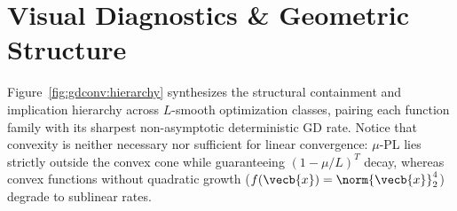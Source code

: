 \documentclass[../../../../master.tex]{subfiles}
\begin{document}
\section{Visual Diagnostics \& Geometric Structure}
\label{sec:gdconv:visuals}

Figure~\ref{fig:gdconv:hierarchy} synthesizes the structural containment and implication hierarchy across $L$-smooth optimization classes, pairing each function family with its sharpest non-asymptotic deterministic GD rate. Notice that convexity is neither necessary nor sufficient for linear convergence: $\mu$-PL lies strictly outside the convex cone while guaranteeing $(1-\mu/L)^T$ decay, whereas convex functions without quadratic growth ($f(\vecb{x}) = \norm{\vecb{x}}_2^4$) degrade to sublinear rates.
\end{document}
